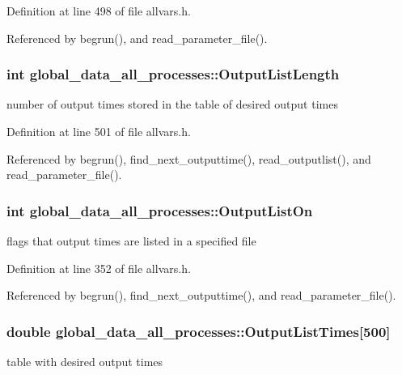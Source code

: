 Definition at line 498 of file allvars.h.



Referenced by begrun(), and read\_\-parameter\_\-file().

\hypertarget{structglobal__data__all__processes_af0ada535a17b75233e0e0de6ff8fa448}{
\subsubsection[{OutputListLength}]{\setlength{\rightskip}{0pt plus 5cm}int {\bf global\_\-data\_\-all\_\-processes::OutputListLength}}}
\label{structglobal__data__all__processes_af0ada535a17b75233e0e0de6ff8fa448}
number of output times stored in the table of desired output times 

Definition at line 501 of file allvars.h.



Referenced by begrun(), find\_\-next\_\-outputtime(), read\_\-outputlist(), and read\_\-parameter\_\-file().

\hypertarget{structglobal__data__all__processes_a4e9d69a3dd88c6aef6f4afd640243950}{
\subsubsection[{OutputListOn}]{\setlength{\rightskip}{0pt plus 5cm}int {\bf global\_\-data\_\-all\_\-processes::OutputListOn}}}
\label{structglobal__data__all__processes_a4e9d69a3dd88c6aef6f4afd640243950}
flags that output times are listed in a specified file 

Definition at line 352 of file allvars.h.



Referenced by begrun(), find\_\-next\_\-outputtime(), and read\_\-parameter\_\-file().

\hypertarget{structglobal__data__all__processes_a7f3307450336a806e545661ba6c79ba5}{
\subsubsection[{OutputListTimes}]{\setlength{\rightskip}{0pt plus 5cm}double {\bf global\_\-data\_\-all\_\-processes::OutputListTimes}\mbox{[}500\mbox{]}}}
\label{structglobal__data__all__processes_a7f3307450336a806e545661ba6c79ba5}
table with desired output times 

